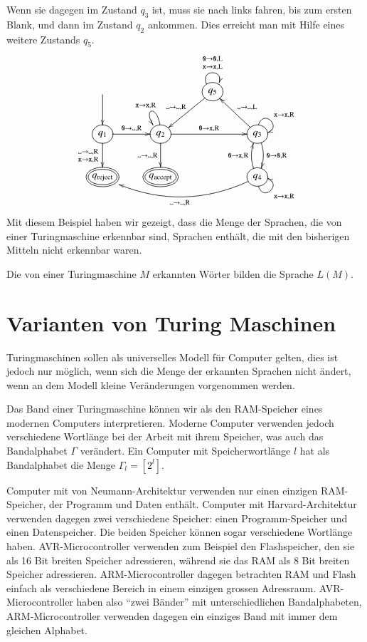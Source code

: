 Wenn sie dagegen im Zustand $q_3$ ist, muss sie nach links fahren,
bis zum ersten Blank, und dann im Zustand $q_2$ ankommen. Dies erreicht
man mit Hilfe eines weitere Zustands $q_5$.
\[
\entrymodifiers={++[o][F]}
\xymatrix{
*+\txt{}\ar[d]
	&*+\txt{}
		&{q_5}\ar@(ul,ur)^{\genfrac{}{}{0pt}{1}{\texttt{0}\to \texttt{0},\text{L}}{{\tt x}\to {\tt x},\text{L}}}
		      \ar[dl]_{\blank\to\blank,\text{R}}
\\
{q_1}\ar[d]_{\genfrac{}{}{0pt}{1}{\blank\to\blank,\text{R}}{{\tt x}\to{\tt x},\text{R}}}
	\ar[r]^{\texttt{0}\to\blank,\text{R}}
	&{q_2}\ar[d]_{\blank\to\blank,\text{R}}
	      \ar[rr]^{\texttt{0}\to{\tt x},\text{R}}
              \ar@(u,ul)_{{\tt x}\to {\tt x},\text{R}}
		&*+\txt{}
			&{q_3}\ar@(u,r)^{{\tt x}\to{\tt x},\text{R}}
			      \ar@/^/[d]^{\texttt{0}\to \texttt{0},\text{R}}
			      \ar[ul]_{\blank\to\blank,\text{L}}
\\
*++[o][F=]{q_\text{reject}}
	&*++[o][F=]{q_\text{accept}}
		&*+\txt{}
			&{q_4}\ar@/^/[u]^{\texttt{0}\to {\tt x},\text{R}}
			      \ar@(d,r)_{{\tt x}\to{\tt x},\text{R}}
			      \ar@/^20pt/[lll]^{\blank\to\blank,\text{R}}
}
\]
Mit diesem Beispiel haben wir gezeigt, dass die Menge der
Sprachen, die von einer Turingmaschine erkennbar sind, Sprachen
enthält, die mit den bisherigen Mitteln nicht erkennbar waren.

\begin{definition}
Die von einer Turingmaschine $M$ erkannten Wörter bilden die
Sprache $L(M)$.
\end{definition}

\section{Varianten von Turing Maschinen}
Turingmaschinen sollen als universelles Modell für Computer gelten,
dies ist jedoch nur möglich, wenn sich die Menge der erkannten Sprachen
nicht ändert, wenn an dem Modell kleine Veränderungen vorgenommen
werden.

Das Band einer Turingmaschine können wir als den RAM-Speicher
eines modernen Computers interpretieren. Moderne Computer verwenden
jedoch verschiedene Wortlänge bei der Arbeit mit ihrem Speicher,
was auch das Bandalphabet $\Gamma$ verändert. Ein Computer mit
Speicherwortlänge $l$ hat als Bandalphabet die Menge $\Gamma_l=[2^l]$.

%
%
Computer mit von Neumann-Architektur verwenden nur einen einzigen RAM-Speicher,
der Programm und Daten enthält. Computer mit Harvard-Architektur
verwenden dagegen zwei verschiedene Speicher: einen Programm-Speicher
und einen Datenspeicher. Die beiden Speicher können sogar verschiedene
Wortlänge haben. AVR-Microcontroller verwenden zum Beispiel
den Flashspeicher, den sie als 16 Bit breiten Speicher adressieren,
während sie das RAM als 8 Bit breiten Speicher adressieren.
ARM-Microcontroller dagegen betrachten RAM und Flash einfach als
verschiedene Bereich in einem einzigen grossen Adressraum.
AVR-Microcontroller haben also ``zwei Bänder'' mit unterschiedlichen
Bandalphabeten, ARM-Microcontroller verwenden dagegen ein einziges Band
mit immer dem gleichen Alphabet.


